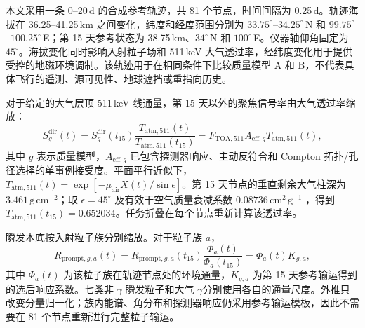\documentclass[11pt]{article}
\newcommand{\revblue}[1]{\textcolor{revisionblue}{#1}}
\begin{document}
本文采用一条 0--20\,d 的合成参考轨迹，共 81 个节点，时间间隔为 0.25\,d。轨迹海拔在 36.25--41.25\,km 之间变化，纬度和经度范围分别为 $33.75^\circ$--$34.25^\circ$\,N 和 $99.75^\circ$--$100.25^\circ$\,E；第 15 天参考状态为 38.75\,km、$34^\circ$\,N 和 $100^\circ$\,E。仪器轴仰角固定为 $45^\circ$。海拔变化同时影响入射粒子场和 511\,keV 大气透过率，经纬度变化用于提供受控的地磁环境调制。该轨迹用于在相同条件下比较质量模型 A 和 B，不代表具体飞行的遥测、源可见性、地球遮挡或重指向历史。

对于给定的大气层顶 511\,keV 线通量，第 15 天以外的聚焦信号率由大气透过率缩放：
\begin{equation}
 S^{\mathrm{dir}}_g(t)
 =S^{\mathrm{dir}}_g(t_{15})
 \frac{T_{\mathrm{atm},511}(t)}{T_{\mathrm{atm},511}(t_{15})}
 =F_{\mathrm{TOA},511}A_{\mathrm{eff},g}T_{\mathrm{atm},511}(t),
 \label{eq:mission_signal_zh}
\end{equation}
其中 $g$ 表示质量模型，$A_{\mathrm{eff},g}$ 已包含探测器响应、主动反符合和 Compton 拓扑/孔径选择的单事例接受度。平面平行近似下，$T_{\mathrm{atm},511}(t)=\exp[-\mu_{\mathrm{air}}X(t)/\sin\epsilon]$。第 15 天节点的垂直剩余大气柱深为 $3.461\,\mathrm{g\,cm^{-2}}$；取 $\epsilon=45^\circ$ 及有效干空气质量衰减系数 $0.08736\,\mathrm{cm^2\,g^{-1}}$ \cite{NISTXCOM}，得到 $T_{\mathrm{atm},511}(t_{15})=0.652034$。任务折叠在每个节点重新计算该透过率。

瞬发本底按入射粒子族分别缩放。对于粒子族 $a$，
\begin{equation}
 R_{\mathrm{prompt},g,a}(t)
 =R_{\mathrm{prompt},g,a}(t_{15})
 \frac{\Phi_a(t)}{\Phi_a(t_{15})}
 =\Phi_a(t)K_{g,a},
 \label{eq:prompt_source_response_zh}
\end{equation}
其中 $\Phi_a(t)$ 为该粒子族在轨迹节点处的环境通量，$K_{g,a}$ 为第 15 天参考输运得到的选后响应系数。七类非 $\gamma$ 瞬发粒子和\revblue{大气 $\gamma$}分别使用各自的通量尺度。外推只改变分量归一化；族内能谱、角分布和探测器响应仍采用参考输运模板，因此不需要在 81 个节点重新进行完整粒子输运。
\end{document}
